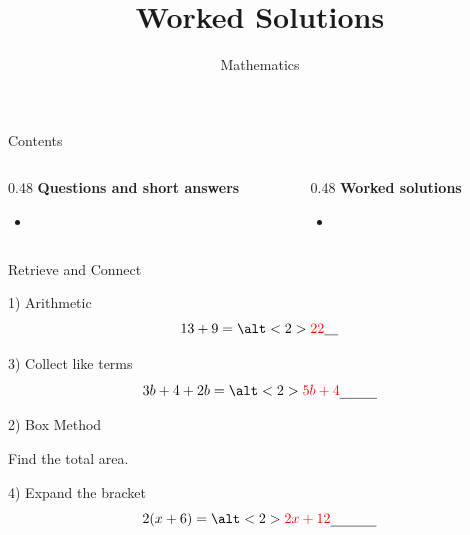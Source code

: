 \documentclass{beamer}
\title{Worked Solutions}
\author{Mathematics}
\date{}
\newcommand{\ablank}[1]{%
  \alt<2>{\textcolor{red}{#1}}{\underline{\phantom{#1}}}%
}
\newcommand{\ashow}[1]{\uncover<2->{\textcolor{red}{\small #1}}}
\newcommand{\ashowq}[1]{\alt<2->{\textcolor{red}{\small #1}}{?}}
\begin{document}
\frame{\titlepage}

\begin{frame}{Contents}
\small
\begin{columns}[T]
\begin{column}{0.48\textwidth}
\textbf{Questions and short answers}
\begin{itemize}
  \item \hyperlink{q-st1}{}
\end{itemize}
\end{column}
\begin{column}{0.48\textwidth}
\textbf{Worked solutions}
\begin{itemize}
  \item \hyperlink{work-st1}{}
\end{itemize}
\end{column}
\end{columns}
\end{frame}

\begin{frame}{Retrieve and Connect}
\hypertarget{q-st1}{}
\begin{minipage}[t]{0.48\textwidth}

\begin{block}{1) Arithmetic}
\Large
\[
13 + 9 = \ablank{22}
\]
\end{block}

\vspace{6.2em}

\begin{block}{3) Collect like terms}
\Large
\[
3b + 4 + 2b = \ablank{5b+4}
\]
\end{block}

\end{minipage}\hfill
\begin{minipage}[t]{0.48\textwidth}

\begin{block}{2) Box Method}
\centering
{}

\vspace{0.4em}
Find the total area. \ashow{Total area $= 32$}

\end{block}

\vspace{0.6em}

\begin{block}{4) Expand the bracket}
\Large
\[
2(x+6) = \ablank{2x+12}
\]
\end{block}

\end{minipage}
\end{frame}
\end{document}

